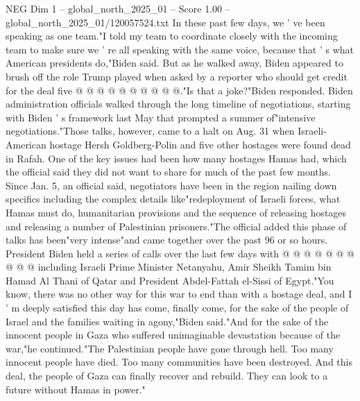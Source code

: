 \begin{textsample}{NEG Dim 1 – global\_north\_2025\_01 – Score 1.00 – global\_north\_2025\_01/120057524.txt}
In these past few days, we ' ve been speaking as one team."I told my team to coordinate closely with the incoming team to make sure we ' re all speaking with the same voice, because that ' s what American presidents do,"Biden said.
But as he walked away, Biden appeared to brush off the role Trump played when asked by a reporter who should get credit for the deal five @ @ @ @ @ @ @ @ @ @."Is that a joke?"Biden responded.
Biden administration officials walked through the long timeline of negotiations, starting with Biden ' s framework last May that prompted a summer of"intensive negotiations."Those talks, however, came to a halt on Aug. 31 when Israeli-American hostage Hersh Goldberg-Polin and five other hostages were found dead in Rafah.
One of the key issues had been how many hostages Hamas had, which the official said they did not want to share for much of the past few months.
Since Jan. 5, an official said, negotiators have been in the region nailing down specifics including the complex details like"redeployment of Israeli forces, what Hamas must do, humanitarian provisions and the sequence of releasing hostages and releasing a number of Palestinian prisoners."The official added this phase of talks has been"very intense"and came together over the past 96 or so hours.
President Biden held a series of calls over the last few days with @ @ @ @ @ @ @ @ @ @ including Israeli Prime Minister Netanyahu, Amir Sheikh Tamim bin Hamad Al Thani of Qatar and President Abdel-Fattah el-Sissi of Egypt."You know, there was no other way for this war to end than with a hostage deal, and I ' m deeply satisfied this day has come, finally come, for the sake of the people of Israel and the families waiting in agony,"Biden said."And for the sake of the innocent people in Gaza who suffered unimaginable devastation because of the war,"he continued."The Palestinian people have gone through hell.
Too many innocent people have died.
Too many communities have been destroyed.
And this deal, the people of Gaza can finally recover and rebuild.
They can look to a future without Hamas in power."

\end{textsample}
